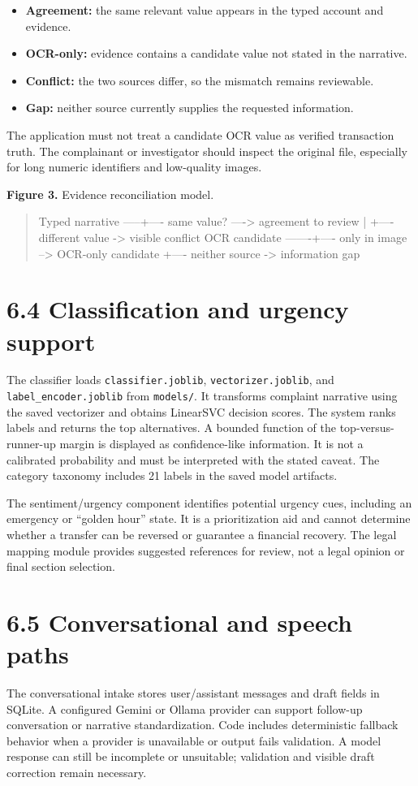 \documentclass[12pt,a4paper,oneside]{report}
\begin{document}
\begin{itemize}
\item \textbf{Agreement:} the same relevant value appears in the typed account and evidence.
\item \textbf{OCR-only:} evidence contains a candidate value not stated in the narrative.
\item \textbf{Conflict:} the two sources differ, so the mismatch remains reviewable.
\item \textbf{Gap:} neither source currently supplies the requested information.
\end{itemize}
The application must not treat a candidate OCR value as verified transaction truth. The complainant or investigator should inspect the original file, especially for long numeric identifiers and low-quality images.

\textbf{Figure 3.} Evidence reconciliation model.

\begin{quote}\ttfamily\small
Typed narrative -----+---- same value? ----> agreement to review
                     |
                     +---- different value -> visible conflict
OCR candidate -------+---- only in image --> OCR-only candidate
                     +---- neither source -> information gap
\end{quote}
\section{6.4 Classification and urgency support}
The classifier loads \texttt{classifier.joblib}, \texttt{vectorizer.joblib}, and \texttt{label\_encoder.joblib} from \texttt{models/}. It transforms complaint narrative using the saved vectorizer and obtains LinearSVC decision scores. The system ranks labels and returns the top alternatives. A bounded function of the top-versus-runner-up margin is displayed as confidence-like information. It is not a calibrated probability and must be interpreted with the stated caveat. The category taxonomy includes 21 labels in the saved model artifacts.

The sentiment/urgency component identifies potential urgency cues, including an emergency or ``golden hour'' state. It is a prioritization aid and cannot determine whether a transfer can be reversed or guarantee a financial recovery. The legal mapping module provides suggested references for review, not a legal opinion or final section selection.

\section{6.5 Conversational and speech paths}
The conversational intake stores user/assistant messages and draft fields in SQLite. A configured Gemini or Ollama provider can support follow-up conversation or narrative standardization. Code includes deterministic fallback behavior when a provider is unavailable or output fails validation. A model response can still be incomplete or unsuitable; validation and visible draft correction remain necessary.
\end{document}

